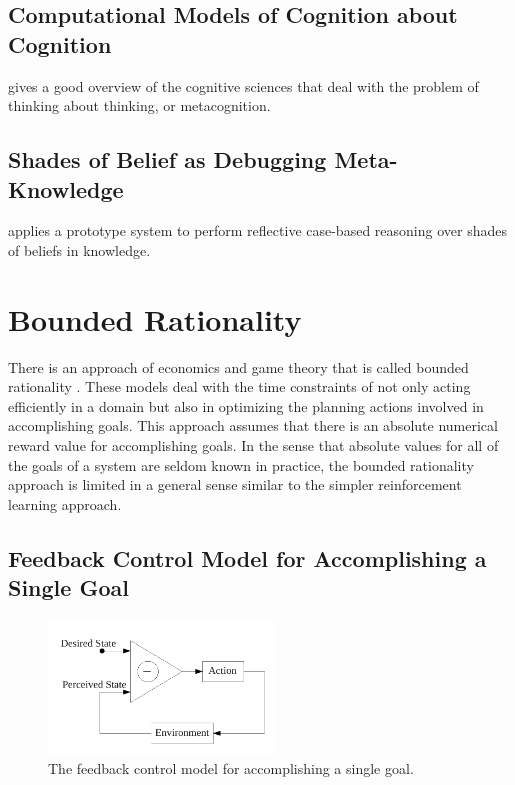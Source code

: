 \subsection{Computational Models of Cognition about Cognition}

\cite{cox:2005} gives a good overview of the cognitive sciences that
deal with the problem of thinking about thinking, or
metacognition.

\subsection{Shades of Belief as Debugging Meta-Knowledge}

\cite{stein:1995} applies a prototype system to perform reflective
case-based reasoning over shades of beliefs in knowledge.

\section{Bounded Rationality}

There is an approach of economics and game theory that is called
bounded rationality \citep{simon:1972}.  These models deal with the
time constraints of not only acting efficiently in a domain but also
in optimizing the planning actions involved in accomplishing goals.
This approach assumes that there is an absolute numerical reward value
for accomplishing goals.  In the sense that absolute values for all of
the goals of a system are seldom known in practice, the bounded
rationality approach is limited in a general sense similar to the
simpler reinforcement learning approach.

\subsection{Feedback Control Model for Accomplishing a Single Goal}

\begin{figure}[bth]
  \center
  \includegraphics[width=6cm]{gfx/feedback_control}
  \caption[The feedback control model for accomplishing a single goal]{The feedback control model for accomplishing a single goal.}
  \label{fig:feedback_control}
\end{figure}


